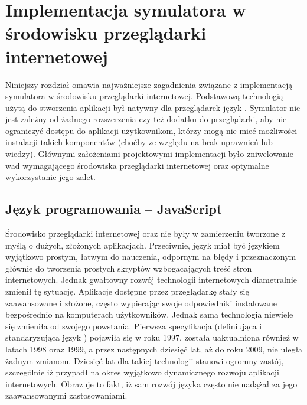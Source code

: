 \chapter{Implementacja symulatora w środowisku przeglądarki internetowej}
\label{cha:implementacja}

Niniejszy rozdział omawia najważniejsze zagadnienia związane z implementacją
symulatora \en w środowisku przeglądarki internetowej. Podstawową technologią
użytą do stworzenia aplikacji był natywny dla przeglądarek język \js.
Symulator nie jest zależny od żadnego rozszerzenia czy też dodatku do
przeglądarki, aby nie ograniczyć dostępu do aplikacji użytkownikom, którzy
mogą nie mieć możliwości instalacji takich komponentów (choćby ze względu na
brak uprawnień lub wiedzy). Głównymi założeniami projektowymi implementacji
było zniwelowanie wad wymagającego środowiska przeglądarki internetowej oraz
optymalne wykorzystanie jego zalet.

\section{Język programowania -- JavaScript}

Środowisko przeglądarki internetowej oraz \js nie były w zamierzeniu tworzone
z myślą o dużych, złożonych aplikacjach. Przeciwnie, język \js miał być
językiem wyjątkowo prostym, łatwym do nauczenia, odpornym na błędy i
przeznaczonym głównie do tworzenia prostych skryptów wzbogacających treść
stron internetowych. Jednak gwałtowny rozwój technologii internetowych
diametralnie zmienił tę sytuację. Aplikacje dostępne przez przeglądarkę stały
się zaawansowane i złożone, często wypierając swoje odpowiedniki instalowane
bezpośrednio na komputerach użytkowników. Jednak sama technologia niewiele się
zmieniła od swojego powstania. Pierwsza specyfikacja 
(definiująca i standaryzująca język ) pojawiła się w roku 1997,
została uaktualniona również w latach 1998 oraz 1999, a przez następnych
dziesięć lat, aż do roku 2009, nie uległa żadnym zmianom. Dziesięć lat dla
takiej technologii stanowi ogromny zastój, szczególnie iż przypadł na okres
wyjątkowo dynamicznego rozwoju aplikacji internetowych. Obrazuje to fakt, iż
sam rozwój języka często nie nadążał za jego zaawansowanymi zastosowaniami.

